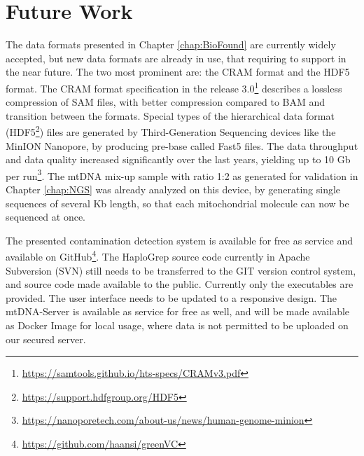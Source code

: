 \section{Future Work}
\label{disc:sec3}
The data formats presented in Chapter \ref{chap:BioFound} are currently widely accepted, but new data formats are already in use, that requiring to support in the near future. The two most prominent are: the CRAM format and the HDF5 format. The CRAM format specification in the release 3.0\footnote{\url{https://samtools.github.io/hts-specs/CRAMv3.pdf}} describes a lossless compression of SAM files, with better compression compared to BAM and transition between the formats. Special types of the hierarchical data format (HDF5\footnote{\url{https://support.hdfgroup.org/HDF5}}) files are generated by Third-Generation Sequencing devices like the MinION Nanopore, by producing pre-base called Fast5 files. The data throughput and data quality increased significantly over the last years, yielding up to 10 Gb per run\footnote{\url{https://nanoporetech.com/about-us/news/human-genome-minion}}. The mtDNA mix-up sample with ratio 1:2 as generated for validation in Chapter \ref{chap:NGS} was already analyzed on this device, by generating single sequences of several Kb length, so that each mitochondrial molecule can now be sequenced at once.

The presented contamination detection system is available for free as service and available on GitHub\footnote{\url{https://github.com/haansi/greenVC}}. The HaploGrep source code currently in Apache Subversion (SVN) still needs to be transferred to the GIT version control system, and source code made available to the public. Currently only the executables are provided.  The user interface needs to be updated to a responsive design. The mtDNA-Server is available as service for free as well, and will be made available as Docker Image for local usage, where data is not permitted to be uploaded on our secured server.

